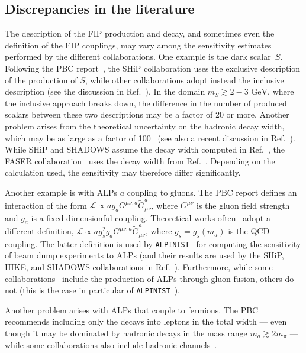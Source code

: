 \documentclass[
    aps,prd,
    twocolumn,
    nofootinbib,
    superscriptaddress,
]{revtex4}
\begin{document}
\subsection{Discrepancies in the literature}
The description of the FIP production and decay, and sometimes even the definition of the FIP couplings, may vary among the sensitivity estimates performed by the different collaborations. One example is the dark scalar~$S$. Following the PBC report~\cite{Beacham:2019nyx}, the SHiP collaboration uses the exclusive description of the production of $S$, while other collaborations adopt instead the inclusive description (see the discussion in Ref.~\cite{Boiarska:2019jcw}). In the domain $m_{S}\gtrsim 2-3\text{ GeV}$, where the inclusive approach breaks down, the difference in the number of produced scalars between these two descriptions may be a factor of 20 or more. Another problem arises from the theoretical uncertainty on the hadronic decay width, which may be as large as a factor of 100~\cite{Winkler:2018qyg,Monin:2018lee} (see also a recent discussion in Ref.~\cite{Gorbunov:2023lga}). While SHiP and SHADOWS assume the decay width computed in Ref.~\cite{Winkler:2018qyg}, the FASER collaboration~\cite{Feng:2017vli} uses the decay width from Ref.~\cite{Bezrukov:2009yw}. Depending on the calculation used, the sensitivity may therefore differ significantly.

Another example is with ALPs $a$ coupling to gluons. The PBC report defines an interaction of the form $\mathcal{L} \propto a g_{a}G^{\mu\nu,a}\tilde{G}_{\mu\nu}^{a}$, where $G^{\mu\nu}$ is the gluon field strength and $g_{a}$ is a fixed dimensionful coupling. Theoretical works often~\cite{Aloni:2018vki,Chakraborty:2021wda} adopt a different definition, $\mathcal{L} \propto a g_{s}^{2} g_{a}G^{\mu\nu,a}\tilde{G}_{\mu\nu}^{a}$, where $g_{s} = g_{s}(m_{a})$ is the QCD coupling. The latter definition is used by \texttt{ALPINIST}~\cite{Jerhot:2022chi} for computing the sensitivity of beam dump experiments to ALPs (and their results are used by the SHiP, HIKE, and SHADOWS collaborations in Ref.~\cite{Antel:2023hkf}). Furthermore, while some collaborations~\cite{Aielli:2019ivi} include the production of ALPs through gluon fusion, others do not (this is the case in particular of \texttt{ALPINIST}~\cite{Jerhot:2022chi}).

Another problem arises with ALPs that couple to fermions. The PBC~\cite{Beacham:2019nyx} recommends including only the decays into leptons in the total width --- even though it may be dominated by hadronic decays in the mass range $m_{a}\gtrsim 2m_{\pi}$ --- while some collaborations also include hadronic channels~\cite{Aielli:2019ivi}.
\end{document}

